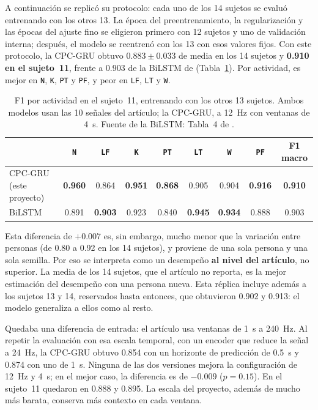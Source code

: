 \documentclass[letterpaper,11pt]{article}
\newcommand{\act}[1]{\texttt{#1}}
\begin{document}
A continuación se replicó su protocolo: cada uno de los 14 sujetos se evaluó entrenando con los otros 13. La época del preentrenamiento, la regularización y las épocas del ajuste fino se eligieron primero con 12 sujetos y uno de validación interna; después, el modelo se reentrenó con los 13 con esos valores fijos. Con este protocolo, la CPC-GRU obtuvo $0.883 \pm 0.033$ de media en los 14 sujetos y \textbf{0.910 en el sujeto~11}, frente a 0.903 de la BiLSTM de \textcite{bassani2025} (Tabla~\ref{tab:sujeto11}). Por actividad, es mejor en \act{N}, \act{K}, \act{PT} y \act{PF}, y peor en \act{LF}, \act{LT} y \act{W}.

\begin{table}[H]
  \centering
  \small
  \caption{F1 por actividad en el sujeto~11, entrenando con los otros 13 sujetos. Ambos modelos usan las 10 señales del artículo; la CPC-GRU, a 12~Hz con ventanas de 4~s. Fuente de la BiLSTM: Tabla~4 de \textcite{bassani2025}.}
  \label{tab:sujeto11}
  \setlength{\tabcolsep}{5pt}
  \begin{tabular}{lcccccccc}
    \toprule
    & \act{N} & \act{LF} & \act{K} & \act{PT} & \act{LT} & \act{W} & \act{PF} & F1 macro \\
    \midrule
    CPC-GRU (este proyecto) & \textbf{0.960} & 0.864 & \textbf{0.951} & \textbf{0.868} & 0.905 & 0.904 & \textbf{0.916} & \textbf{0.910} \\
    BiLSTM \parencite{bassani2025}          & 0.891 & \textbf{0.903} & 0.923 & 0.840 & \textbf{0.945} & \textbf{0.934} & 0.888 & 0.903 \\
    \bottomrule
  \end{tabular}
\end{table}

Esta diferencia de $+0.007$ es, sin embargo, mucho menor que la variación entre personas (de 0.80 a 0.92 en los 14 sujetos), y proviene de una sola persona y una sola semilla. Por eso se interpreta como un desempeño \textbf{al nivel del artículo}, no superior. La media de los 14 sujetos, que el artículo no reporta, es la mejor estimación del desempeño con una persona nueva. Esta réplica incluye además a los sujetos 13 y 14, reservados hasta entonces, que obtuvieron 0.902 y 0.913: el modelo generaliza a ellos como al resto.

Quedaba una diferencia de entrada: el artículo usa ventanas de 1~s a 240~Hz. Al repetir la evaluación con esa escala temporal, con un encoder que reduce la señal a 24~Hz, la CPC-GRU obtuvo 0.854 con un horizonte de predicción de 0.5~s y 0.874 con uno de 1~s. Ninguna de las dos versiones mejora la configuración de 12~Hz y 4~s; en el mejor caso, la diferencia es de $-0.009$ ($p = 0.15$). En el sujeto~11 quedaron en 0.888 y 0.895. La escala del proyecto, además de mucho más barata, conserva más contexto en cada ventana.
\end{document}
